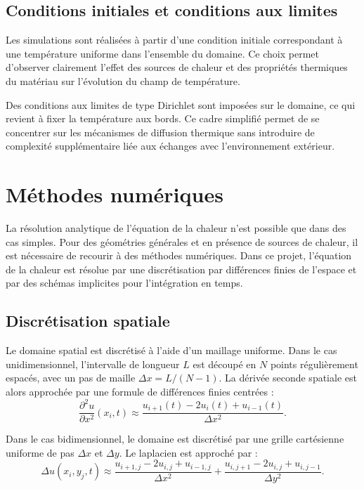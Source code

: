 \documentclass[a4paper,12pt]{article}
\begin{document}
\subsection{Conditions initiales et conditions aux limites}

Les simulations sont réalisées à partir d’une condition initiale correspondant à une température uniforme dans l’ensemble du domaine. Ce choix permet d’observer clairement l’effet des sources de chaleur et des propriétés thermiques du matériau sur l’évolution du champ de température.

Des conditions aux limites de type Dirichlet sont imposées sur le domaine, ce qui revient à fixer la température aux bords. Ce cadre simplifié permet de se concentrer sur les mécanismes de diffusion thermique sans introduire de complexité supplémentaire liée aux échanges avec l’environnement extérieur.

\section{Méthodes numériques}

La résolution analytique de l’équation de la chaleur n’est possible que dans des cas simples. Pour des géométries générales et en présence de sources de chaleur, il est nécessaire de recourir à des méthodes numériques. Dans ce projet, l’équation de la chaleur est résolue par une discrétisation par différences finies de l’espace et par des schémas implicites pour l’intégration en temps.

\subsection{Discrétisation spatiale}

Le domaine spatial est discrétisé à l’aide d’un maillage uniforme. Dans le cas unidimensionnel, l’intervalle de longueur $L$ est découpé en $N$ points régulièrement espacés, avec un pas de maille $\Delta x = L/(N-1)$. La dérivée seconde spatiale est alors approchée par une formule de différences finies centrées :
\begin{equation}
\frac{\partial^2 u}{\partial x^2}(x_i,t)
\approx
\frac{u_{i+1}(t) - 2u_i(t) + u_{i-1}(t)}{\Delta x^2}.
\end{equation}

Dans le cas bidimensionnel, le domaine est discrétisé par une grille cartésienne uniforme de pas $\Delta x$ et $\Delta y$. Le laplacien est approché par :
\begin{equation}
\Delta u(x_i,y_j,t)
\approx
\frac{u_{i+1,j} - 2u_{i,j} + u_{i-1,j}}{\Delta x^2}
+
\frac{u_{i,j+1} - 2u_{i,j} + u_{i,j-1}}{\Delta y^2}.
\end{equation}
\end{document}
